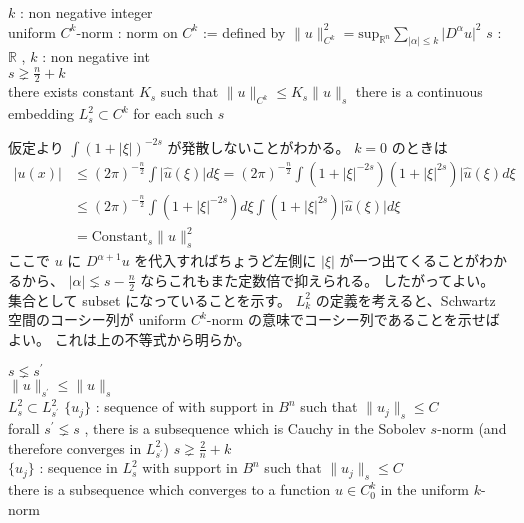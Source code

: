 \begin{Theorem}
\itemdefi
  \For \(k\) : non negative integer \\
  \Define uniform \(C^k\)-norm : norm on \(C^k\) := defined by \(\lVert u \rVert^2_{C^k} = \text{sup}_{\mathbb{R}^n} \sum_{\lvert \alpha \rvert \leq k} \lvert D^\alpha u \rvert^2\)
\itemprop
  \For \(s\) : \(\mathbb{R}\) , \(k\) : non negative int \\
  \IfHold \(s \gneq \frac{n}{2} + k\) \\
  \Then there exists constant \(K_s\) such that \(\lVert u \rVert_{C^k} \leq K_s \lVert u \rVert_s\)
\itemprop
  \Then there is a continuous embedding \(L^2_s \subset C^k\) for each such \(s\)
\end{Theorem}

\begin{Proof}
\itemprof
  仮定より \(\int (1 + \lvert \xi \rvert)^{-2s}\) が発散しないことがわかる。
  \(k = 0\) のときは
  \begin{align*}
    \lvert u(x) \rvert
    &\leq (2 \pi)^{- \frac{n}{2}} \int \lvert \hat{u}(\xi) \rvert d \xi
    = (2 \pi)^{- \frac{n}{2}} \int (1 + \lvert \xi \rvert^{-2s}) (1 + \lvert \xi \rvert^{2s}) \lvert \hat{u}(\xi) d \xi \\
    &\leq (2 \pi)^{- \frac{n}{2}} \int (1 + \lvert \xi \rvert^{-2s}) d \xi \int (1 + \lvert \xi \rvert^{2s}) \lvert \hat{u}(\xi) \rvert d \xi \\
    &= \text{Constant}_s \lVert u \rVert_s^2
  \end{align*}
  ここで \(u\) に \(D^{\alpha + 1}u\) を代入すればちょうど左側に \(\lvert \xi \rvert\) が一つ出てくることがわかるから、 \(\lvert \alpha \rvert \lneq s - \frac{n}{2}\) ならこれもまた定数倍で抑えられる。
  したがってよい。
\itemprof
  集合として subset になっていることを示す。 \(L^2_k\) の定義を考えると、Schwartz 空間のコーシー列が uniform \(C^k\)-norm の意味でコーシー列であることを示せばよい。
  これは上の不等式から明らか。
\end{Proof}

\begin{Theorem}
\itemprop
  \For \(s \lneq s^{\prime}\) \\
  \Then \(\lVert u \rVert_{s^\prime} \leq \lVert u \rVert_s\) \\
  \Then \(L^2_s \subset L^2_{s^{\prime}}\)
\itemprop
  \For \(\{u_j\}\) : sequence of  with support in \(B^n\) such that \(\lVert u_j \rVert_s \leq C\) \\
  \Then forall \(s^{\prime} \lneq s\) , there is a subsequence which is Cauchy in the Sobolev \(s\)-norm (and therefore converges in \(L_{s^\prime}^2\)) 
\itemprop
  \IfHold \(s \gneq \frac{2}{n} + k\) \\
  \For \(\{u_j\}\) : sequence in \(L^2_s\) with support in \(B^n\) such that \(\lVert u_j \rVert_s \leq C\) \\
  \Then there is a subsequence which converges to a function \(u \in C^k_0\) in the uniform \(k\)-norm
\end{Theorem}

